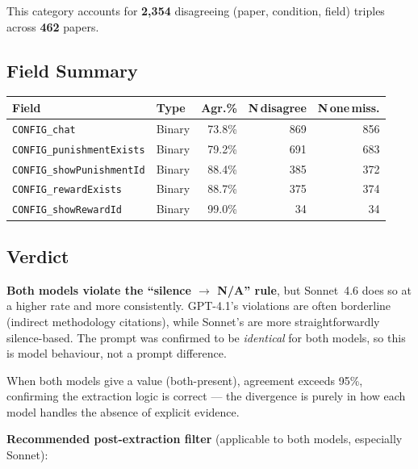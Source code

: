 \documentclass[11pt,a4paper]{article}
\begin{document}
        This category accounts for \textbf{2,354} disagreeing
        (paper, condition, field) triples across \textbf{462} papers.

        \subsection{Field Summary}
        \begin{center}\small
\begin{tabular}{llrrr}
\toprule
\textbf{Field} & \textbf{Type} & \textbf{Agr.\%} & \textbf{N\,disagree} & \textbf{N\,one\,miss.}\\
\midrule
\rowcolor{orange!28}\texttt{CONFIG\_chat} & Binary & 73.8\% & 869 & 856\\
\rowcolor{orange!28}\texttt{CONFIG\_punishmentExists} & Binary & 79.2\% & 691 & 683\\
\rowcolor{green!18}\texttt{CONFIG\_showPunishmentId} & Binary & 88.4\% & 385 & 372\\
\rowcolor{green!18}\texttt{CONFIG\_rewardExists} & Binary & 88.7\% & 375 & 374\\
\rowcolor{green!18}\texttt{CONFIG\_showRewardId} & Binary & 99.0\% & 34 & 34\\
\bottomrule
\end{tabular}
\end{center}

        \subsection{Verdict}
                    \textbf{Both models violate the ``silence $\rightarrow$ N/A'' rule}, but
            Sonnet~4.6 does so at a higher rate and more consistently.  GPT-4.1's
            violations are often borderline (indirect methodology citations), while
            Sonnet's are more straightforwardly silence-based.  The prompt was
            confirmed to be \emph{identical} for both models, so this is model
            behaviour, not a prompt difference.

            When both models give a value (both-present), agreement exceeds 95\%,
            confirming the extraction logic is correct --- the divergence is purely
            in how each model handles the absence of explicit evidence.

            \textbf{Recommended post-extraction filter} (applicable to both models,
            especially Sonnet):
\end{document}
